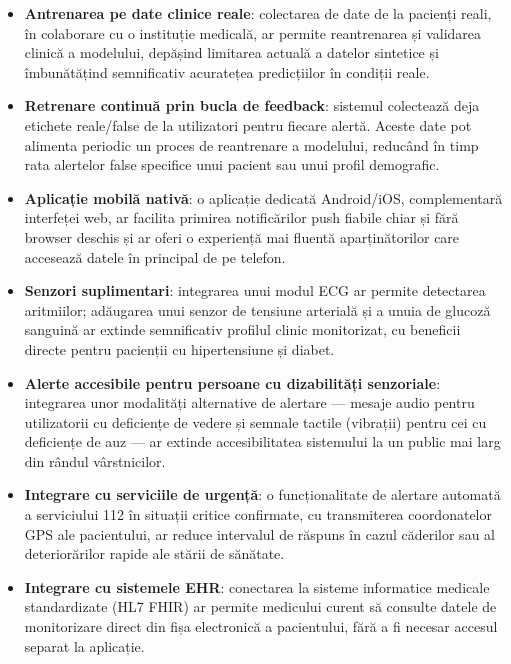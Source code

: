 \documentclass[12pt,a4paper,twoside]{article}
\begin{document}
\begin{itemize}[leftmargin=1.5em]
\item \textbf{Antrenarea pe date clinice reale}: colectarea de date de la pacienți reali, în colaborare cu o instituție medicală, ar permite reantrenarea și validarea clinică a modelului, depășind limitarea actuală a datelor sintetice și îmbunătățind semnificativ acuratețea predicțiilor în condiții reale.

\item \textbf{Retrenare continuă prin bucla de feedback}: sistemul colectează deja etichete reale/false de la utilizatori pentru fiecare alertă. Aceste date pot alimenta periodic un proces de reantrenare a modelului, reducând în timp rata alertelor false specifice unui pacient sau unui profil demografic.

\item \textbf{Aplicație mobilă nativă}: o aplicație dedicată Android/iOS, complementară interfeței web, ar facilita primirea notificărilor push fiabile chiar și fără browser deschis și ar oferi o experiență mai fluentă aparținătorilor care accesează datele în principal de pe telefon.

\item \textbf{Senzori suplimentari}: integrarea unui modul ECG ar permite detectarea aritmiilor; adăugarea unui senzor de tensiune arterială și a unuia de glucoză sanguină ar extinde semnificativ profilul clinic monitorizat, cu beneficii directe pentru pacienții cu hipertensiune și diabet.

\item \textbf{Alerte accesibile pentru persoane cu dizabilități senzoriale}: integrarea unor modalități alternative de alertare — mesaje audio pentru utilizatorii cu deficiențe de vedere și semnale tactile (vibrații) pentru cei cu deficiențe de auz — ar extinde accesibilitatea sistemului la un public mai larg din rândul vârstnicilor.

\item \textbf{Integrare cu serviciile de urgență}: o funcționalitate de alertare automată a serviciului 112 în situații critice confirmate, cu transmiterea coordonatelor GPS ale pacientului, ar reduce intervalul de răspuns în cazul căderilor sau al deteriorărilor rapide ale stării de sănătate.

\item \textbf{Integrare cu sistemele EHR}: conectarea la sisteme informatice medicale standardizate (HL7 FHIR) ar permite medicului curent să consulte datele de monitorizare direct din fișa electronică a pacientului, fără a fi necesar accesul separat la aplicație.


\end{itemize}
\end{document}
